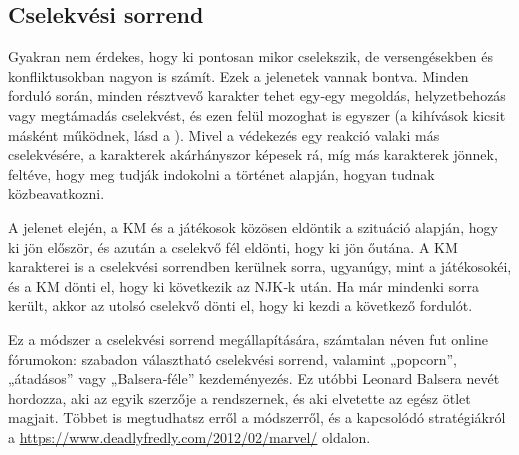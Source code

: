 \subsection{Cselekvési sorrend}

Gyakran nem érdekes, hogy ki pontosan mikor cselekszik, de versengésekben és konfliktusokban nagyon is számít. Ezek a jelenetek  vannak bontva. Minden forduló során, minden résztvevő karakter tehet egy‑egy megoldás, helyzetbehozás vagy megtámadás cselekvést, és ezen felül mozoghat is egyszer (a kihívások kicsit másként működnek, lásd a ). Mivel a védekezés egy reakció valaki más cselekvésére, a karakterek akárhányszor képesek rá, míg más karakterek jönnek, feltéve, hogy meg tudják indokolni a történet alapján, hogyan tudnak közbeavatkozni.

A jelenet elején, a KM és a játékosok közösen eldöntik a szituáció alapján, hogy ki jön először, és azután a cselekvő fél eldönti, hogy ki jön őutána. A KM karakterei is a cselekvési sorrendben kerülnek sorra, ugyanúgy, mint a játékosokéi, és a KM dönti el, hogy ki következik az NJK‑k után. Ha már mindenki sorra került, akkor az utolsó cselekvő dönti el, hogy ki kezdi a következő fordulót.


Ez a módszer a cselekvési sorrend megállapítására, számtalan néven fut online fórumokon: szabadon választható cselekvési sorrend, valamint „popcorn”, „átadásos” vagy „Balsera‑féle” kezdeményezés. Ez utóbbi Leonard Balsera nevét hordozza, aki az egyik szerzője a  rendszernek, és aki elvetette az egész ötlet magjait. Többet is megtudhatsz erről a módszerről, és a kapcsolódó stratégiákról a \url{https://www.deadlyfredly.com/2012/02/marvel/} oldalon.
